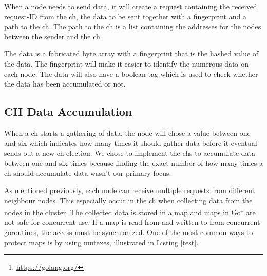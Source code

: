\documentclass[USenglish]{uit-thesis}
\begin{document}
When a node needs to send data, it will create a request containing the received request-ID from the \gls{ch}, the data to be sent together with a fingerprint and a path to the \gls{ch}. The path to the \gls{ch} is a list containing the addresses for the nodes between the sender and the \gls{ch}.


The data is a fabricated byte array with a fingerprint that is the hashed value of the data. The fingerprint will make it easier to identify the numerous data on each node. The data will also have a boolean tag which is used to check whether the data has been accumulated or not. 


\subsection{CH Data Accumulation}
When a \gls{ch} starts a gathering of data, the node will chose a value between one and six which indicates how many times it should gather data before it eventual sends out a new \gls{ch}-election. We chose to implement the \glspl{ch} to accumulate data between one and six times because finding the exact number of how many times a \gls{ch} should accumulate data wasn't our primary focus.



As mentioned previously, each node can receive multiple requests from different neighbour nodes.
This especially occur in the \gls{ch} when collecting data from the nodes in the cluster. The collected data is stored in a map and maps in Go\footnote{\url{https://golang.org/}} are not safe for concurrent use. If a map is read from and written to from concurrent goroutines, the access must be synchronized. One of the most common ways to protect maps is by using mutexes, illustrated in Listing \ref{test}.

\end{document}
